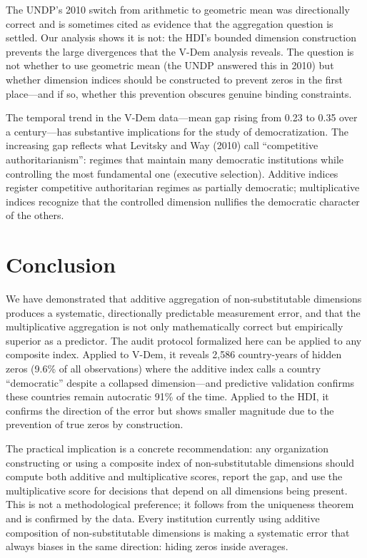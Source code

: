 \documentclass[12pt]{article}
\begin{document}
The UNDP's 2010 switch from arithmetic to geometric mean was directionally correct and is sometimes cited as evidence that the aggregation question is settled. Our analysis shows it is not: the HDI's bounded dimension construction prevents the large divergences that the V-Dem analysis reveals. The question is not whether to use geometric mean (the UNDP answered this in 2010) but whether dimension indices should be constructed to prevent zeros in the first place---and if so, whether this prevention obscures genuine binding constraints.

The temporal trend in the V-Dem data---mean gap rising from 0.23 to 0.35 over a century---has substantive implications for the study of democratization. The increasing gap reflects what Levitsky and Way (2010) call ``competitive authoritarianism'': regimes that maintain many democratic institutions while controlling the most fundamental one (executive selection). Additive indices register competitive authoritarian regimes as partially democratic; multiplicative indices recognize that the controlled dimension nullifies the democratic character of the others.


\section{Conclusion}

We have demonstrated that additive aggregation of non-substitutable dimensions produces a systematic, directionally predictable measurement error, and that the multiplicative aggregation is not only mathematically correct but empirically superior as a predictor. The audit protocol formalized here can be applied to any composite index. Applied to V-Dem, it reveals 2,586 country-years of hidden zeros (9.6\% of all observations) where the additive index calls a country ``democratic'' despite a collapsed dimension---and predictive validation confirms these countries remain autocratic 91\% of the time. Applied to the HDI, it confirms the direction of the error but shows smaller magnitude due to the prevention of true zeros by construction.

The practical implication is a concrete recommendation: any organization constructing or using a composite index of non-substitutable dimensions should compute both additive and multiplicative scores, report the gap, and use the multiplicative score for decisions that depend on all dimensions being present. This is not a methodological preference; it follows from the uniqueness theorem and is confirmed by the data. Every institution currently using additive composition of non-substitutable dimensions is making a systematic error that always biases in the same direction: hiding zeros inside averages.
\end{document}
